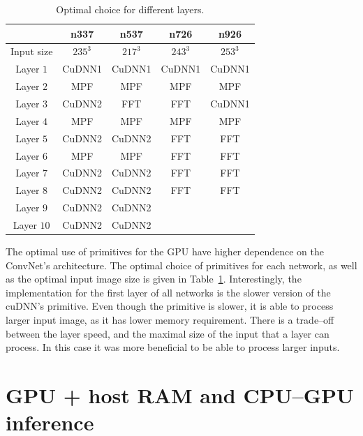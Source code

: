 \documentclass[conference]{./IEEEtran/IEEEtran}
\begin{document}
  \begin{table}
    {\footnotesize
    \centering
    \begin{tabular}{ccccc}
      \toprule
      & n337    & n537  &  n726  &  n926 \\
      \midrule
      Input size & $235^3$ &  $217^3$  & $243^3$  & $253^3$ \\
      \midrule
      Layer $1$  &  CuDNN1  &  CuDNN1  & CuDNN1   & CuDNN1  \\
      Layer $2$  &  MPF     &  MPF     & MPF      & MPF     \\
      Layer $3$  &  CuDNN2  &  FFT     & FFT      & CuDNN1  \\
      Layer $4$  &  MPF     &  MPF     & MPF      & MPF     \\
      Layer $5$  &  CuDNN2  &  CuDNN2  & FFT      & FFT     \\
      Layer $6$  &  MPF     &  MPF     & FFT      & FFT     \\
      Layer $7$  &  CuDNN2  &  CuDNN2  & FFT      & FFT     \\
      Layer $8$  &  CuDNN2  &  CuDNN2  & FFT      & FFT     \\
      Layer $9$  &  CuDNN2  &  CuDNN2  & & \\
      Layer $10$ &  CuDNN2  &  CuDNN2  & & \\
      \bottomrule
    \end{tabular}
    \caption{Optimal choice for different layers.}
    \label{table:gpu_optimal}
    }
  \end{table}

  The optimal use of primitives for the GPU have higher dependence on
  the ConvNet's architecture.  The optimal choice of primitives for
  each network, as well as the optimal input image size is given in
  Table~\ref{table:gpu_optimal}.  Interestingly, the implementation
  for the first layer of all networks is the slower version of the
  cuDNN's primitive.  Even though the primitive is slower, it is able
  to process larger input image, as it has lower memory requirement.
  There is a trade--off between the layer speed, and the maximal size
  of the input that a layer can process.  In this case it was more
  beneficial to be able to process larger inputs.


\section{GPU + host RAM and CPU--GPU inference}
\end{document}
